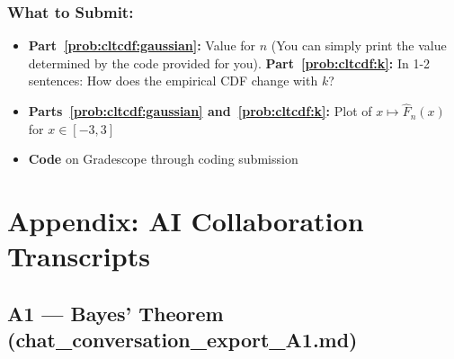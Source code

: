 \documentclass{article}
\begin{document}
\begin{aprob}
    \subsubsection*{What to Submit:}
    \begin{itemize}
        \item \textbf{Part~\ref{prob:cltcdf:gaussian}:} Value for $n$ (You can simply print the value determined by the code provided for you).
        \textbf{Part~\ref{prob:cltcdf:k}:} In 1-2 sentences: How does the empirical CDF change with $k$?
        \item \textbf{Parts~\ref{prob:cltcdf:gaussian} and~\ref{prob:cltcdf:k}:} Plot of $x\mapsto \widehat{F}_n(x)$ for $x \in [-3, 3]$
        \item \textbf{Code} on Gradescope through coding submission
    \end{itemize}
\end{aprob}

\clearpage{}
\appendix
\section*{Appendix: AI Collaboration Transcripts}

\subsection*{A1 --- Bayes' Theorem (chat\_conversation\_export\_A1.md)}
\end{document}
